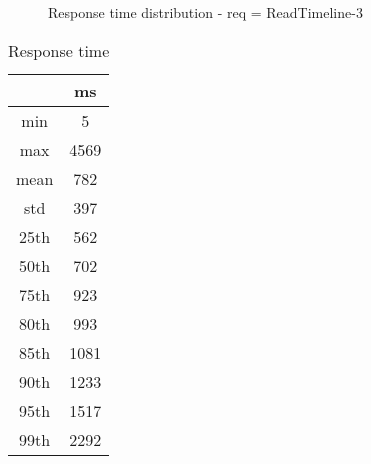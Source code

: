 \begin{minipage}{0.75\linewidth}
\begin{figure}[h]
\begin{adjustbox}{max width=1.0\linewidth, keepaspectratio}
  \end{adjustbox}
  \caption{Response time distribution - req = ReadTimeline-3}
\end{figure}
\end{minipage}\hfill\begin{minipage}{0.18\linewidth}
\begin{table}[h]
\begin{tabular}{|cc|}
\hline
\textbf{} & \textbf{ms}\\ \hline
 \Xhline{0.005\arrayrulewidth}
min & 5\\
 \Xhline{0.005\arrayrulewidth}
max & 4569\\
 \Xhline{0.005\arrayrulewidth}
mean & 782\\
 \Xhline{0.005\arrayrulewidth}
std & 397\\
\hline
\hline
 \Xhline{0.005\arrayrulewidth}
25th & 562\\
 \Xhline{0.005\arrayrulewidth}
50th & 702\\
 \Xhline{0.005\arrayrulewidth}
75th & 923\\
 \Xhline{0.005\arrayrulewidth}
80th & 993\\
 \Xhline{0.005\arrayrulewidth}
85th & 1081\\
 \Xhline{0.005\arrayrulewidth}
90th & 1233\\
 \Xhline{0.005\arrayrulewidth}
95th & 1517\\
 \Xhline{0.005\arrayrulewidth}
99th & 2292\\
\hline
\end{tabular}
\caption{Response time}
\end{table}
\end{minipage}\hfill